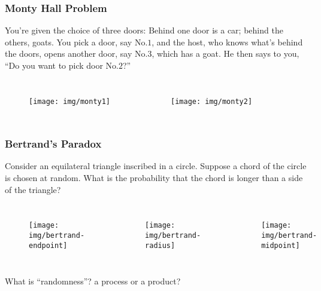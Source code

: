 \documentclass[UTF8,aspectratio=43,11pt,colorlinks,compress,openany]{beamer}%
\begin{document}
\begin{frame}\frametitle{Monty Hall Problem}
	\begin{problem}
		You're given the choice of three doors: Behind one door is a car; behind the others, goats. You pick a door, say No.$1$, and the host, who knows what's behind the doors, opens another door, say No.$3$, which has a goat. He then says to you, ``Do you want to pick door No.$2$?''
	\end{problem}
	\begin{columns}
			\begin{figure}
				\texttt{[image: img/monty1]}
			\end{figure}
			\begin{figure}
				\texttt{[image: img/monty2]}
			\end{figure}
	\end{columns}
\end{frame}

\begin{frame}\frametitle{Bertrand's Paradox}
	\begin{problem}
		Consider an equilateral triangle inscribed in a circle. Suppose a chord of the circle is chosen at random. What is the probability that the chord is longer than a side of the triangle?
	\end{problem}
	\begin{columns}
		\column{0.3\textwidth}
			\begin{figure}
				\texttt{[image: img/bertrand-endpoint]}
			\end{figure}
		\column{0.3\textwidth}
			\begin{figure}
				\texttt{[image: img/bertrand-radius]}
			\end{figure}
		\column{0.3\textwidth}
			\begin{figure}
				\texttt{[image: img/bertrand-midpoint]}
			\end{figure}
	\end{columns}
	\begin{center}
		What is ``randomness''? a process or a product?
	\end{center}
\end{frame}
\end{document}
